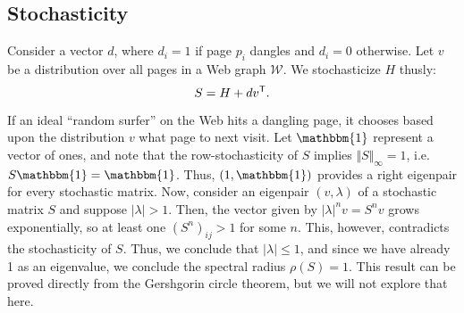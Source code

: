 \documentclass[../exploring-pagerank.tex]{subfiles}
\begin{document}
	\subsection{Stochasticity}
	 Consider a vector $d$, where $d_i=1$ if page $p_i$ dangles and $d_i=0$ otherwise. Let $v$ be a distribution over all pages in a Web graph $\mathcal{W}$.  We stochasticize $H$ thusly:
	\begin{equation}
	    \label{eqn:S}
		S=H + dv^{\mathsf{T}}.
	\end{equation}

	 If an ideal ``random surfer'' on the Web hits a dangling page, it chooses based upon the distribution $v$ what page to next visit. Let $\mathbbm{1}$ represent a vector of ones, and note that the row-stochasticity of $S$ implies $\Vert S \Vert_{\infty} = 1$, i.e. $S \mathbbm{1} = \mathbbm{1}$. Thus, $(1, \mathbbm{1})$ provides a right eigenpair for every stochastic matrix. Now, consider an eigenpair $(v, \lambda)$ of a stochastic matrix $S$ and suppose $|\lambda| > 1$. Then, the vector given by $|\lambda|^n v = S^n v$ grows exponentially, so at least one $(S^n)_{ij} > 1$ for some $n$. This, however, contradicts the stochasticity of $S$. Thus, we conclude that $|\lambda| \leq 1$, and since we have already 1 as an eigenvalue, we conclude the spectral radius $\rho(S)=1$. This result can be proved directly from the Gershgorin circle theorem, but we will not explore that here.
\end{document}
